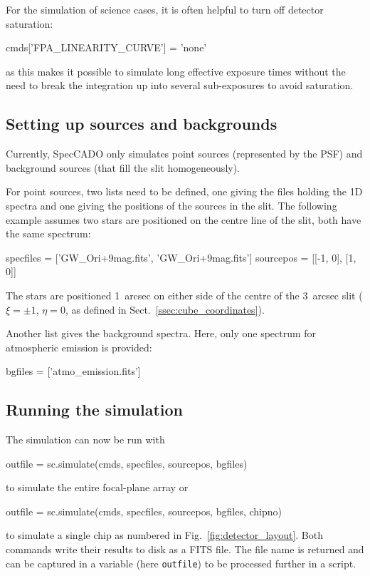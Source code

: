 \documentclass[a4paper,twoside,11pt]{article}
\begin{document}
For the simulation of science cases, it is often helpful to turn off
detector saturation:
\begin{pyin}
cmds['FPA_LINEARITY_CURVE'] = 'none'
\end{pyin}
as this makes it possible to simulate long effective exposure times
without the need to break the integration up into several
sub-exposures to avoid saturation.

\subsection{Setting up sources and backgrounds}
\label{ssec:simulation_sources}

Currently, SpecCADO only simulates point sources (represented by the
PSF) and background sources (that fill the slit homogeneously).

For point sources, two lists need to be defined, one giving the files
holding the 1D spectra and one giving the positions of the sources in
the slit. The following example assumes two stars are positioned on
the centre line of the slit, both have the same spectrum:
\begin{pyin}
specfiles = ['GW_Ori+9mag.fits', 'GW_Ori+9mag.fits']
sourcepos = [[-1, 0], [1, 0]]
\end{pyin}
The stars are positioned 1~arcsec on either side of the centre of the
3~arcsec slit ($\xi=\pm 1$, $\eta=0$, as defined in
Sect.~\ref{ssec:cube_coordinates}).

Another list gives the background spectra. Here, only one spectrum for
atmospheric emission is provided:
\begin{pyin}
bgfiles = ['atmo_emission.fits']
\end{pyin}

\subsection{Running the simulation}
\label{ssec:simulation_run}

The simulation can now be run with
\begin{pyin}
outfile = sc.simulate(cmds, specfiles, sourcepos, bgfiles)
\end{pyin}
to simulate the entire focal-plane array or
\begin{pyin}
outfile = sc.simulate(cmds, specfiles, sourcepos, bgfiles, chipno)
\end{pyin}
to simulate a single chip as numbered in
Fig.~\ref{fig:detector_layout}. Both commands write their results to
disk as a FITS file. The file name is returned and can be captured in a
variable (here \lstinline{outfile}) to be processed further in a
script.
\end{document}
